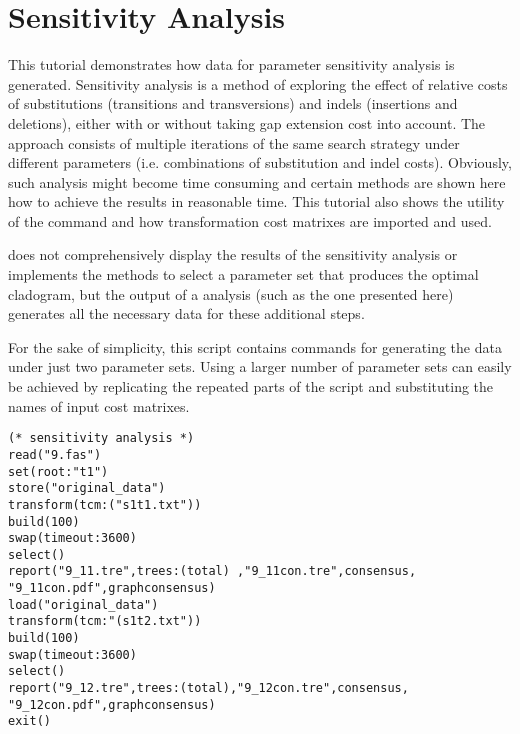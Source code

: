 
\section{Sensitivity Analysis}{\label{tutorial7}}

This tutorial demonstrates how data for parameter sensitivity analysis is generated. Sensitivity analysis 
\cite{wheeler1995} is a method of exploring the effect of relative costs of substitutions (transitions and 
transversions) and indels (insertions and deletions), either with or without taking gap extension cost into 
account. The approach consists of multiple iterations of the same search strategy under different parameters 
(i.e. combinations of substitution and indel costs).  Obviously, such analysis might become time 
consuming and certain methods are shown here how to achieve the results in reasonable time. This tutorial also
 shows the utility of the command  and how transformation cost matrixes are imported and 
 used.

\poy does not comprehensively display the results of the sensitivity analysis or implements the methods to select 
a parameter set that produces the optimal cladogram, but the output of a \poy analysis (such as the one 
presented here) generates all the necessary data for these additional steps.

For the sake of simplicity, this script contains commands for generating the data under just two parameter  sets. 
Using a larger number of parameter sets can easily be achieved by replicating the repeated parts of the script 
and substituting the names of input cost matrixes.

\begin{verbatim}
(* sensitivity analysis *)
read("9.fas")
set(root:"t1")
store("original_data")
transform(tcm:("s1t1.txt"))
build(100)
swap(timeout:3600)
select()
report("9_11.tre",trees:(total) ,"9_11con.tre",consensus,
"9_11con.pdf",graphconsensus)
load("original_data")
transform(tcm:"(s1t2.txt"))
build(100)
swap(timeout:3600)
select()
report("9_12.tre",trees:(total),"9_12con.tre",consensus,
"9_12con.pdf",graphconsensus)
exit()
\end{verbatim}

